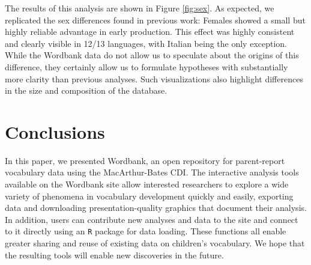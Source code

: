 \documentclass[doc,noapacite]{apa2}
\begin{document}
The results of this analysis are shown in Figure \ref{fig:sex}. As expected, we replicated the sex differences found in previous work: Females showed a small but highly reliable advantage in early production. This effect was highly consistent and clearly visible in 12/13 languages, with Italian being the only exception. While the Wordbank data do not allow us to speculate about the origins of this difference, they certainly allow us to formulate hypotheses with substantially more clarity than previous analyses. Such visualizations also highlight differences in the size and composition of the database.

\section{Conclusions}

In this paper, we presented Wordbank, an open repository for parent-report vocabulary data using the MacArthur-Bates CDI. The interactive analysis tools available on the Wordbank site allow interested researchers to explore a wide variety of phenomena in vocabulary development quickly and easily, exporting data and downloading presentation-quality graphics that document their analysis. In addition, users can contribute new analyses and data to the site and connect to it directly using an \texttt{R} package for data loading. These functions all enable greater sharing and reuse of existing data on children's vocabulary. We hope that the resulting tools will enable new discoveries in the future.



\end{document}
